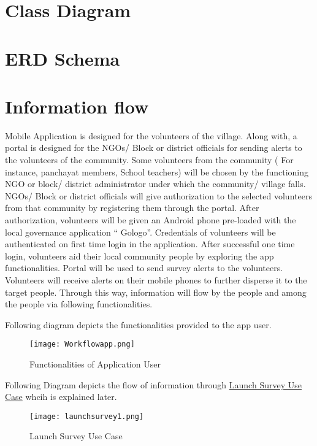 \section{Class Diagram}
\section{ERD Schema}
\section{Information flow}
Mobile Application is designed for the volunteers of the village. Along with, a portal is designed for the  NGOs/ Block or district officials for sending alerts to the volunteers of the community. Some volunteers from the community ( For instance, panchayat members, School teachers) will be chosen by the functioning NGO or block/ district administrator under which the community/ village falls. NGOs/ Block or district officials will give authorization to the selected volunteers from that community by registering them through the portal. After authorization, volunteers will be given an Android phone pre-loaded with the local governance application “ Gologo”. Credentials of volunteers will be authenticated on first time login in the application. After successful one time login, volunteers aid their local community people by exploring the app functionalities. Portal will be used to send survey alerts to the volunteers. Volunteers will receive alerts  on their mobile phones to further disperse it to the target people. Through this way, information will flow by the people and  among the people via following functionalities.

Following diagram depicts the functionalities provided to the app user.

\begin{figure}[H]
    \centering
	\texttt{[image: Workflowapp.png]}
    \caption{Functionalities of Application User}
    \label{fig:Functionalities of Application User}
\end{figure}

Following Diagram depicts the flow of information through \hyperref[itm:launchsur]{Launch Survey Use Case} whcih is explained later.

\begin{figure}[H]
    \centering
	\texttt{[image: launchsurvey1.png]}
    \caption{Launch Survey Use Case}
    \label{fig:Launch Survey Use Case}
\end{figure}
